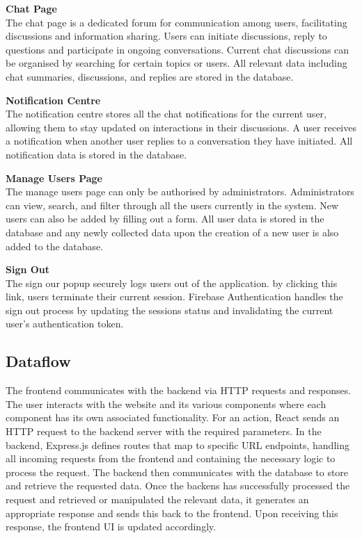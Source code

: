 \textbf{Chat Page}\\
The chat page is a dedicated forum for communication among users, facilitating discussions and information sharing. Users can initiate discussions, reply to questions and participate in ongoing conversations. Current chat discussions can be organised by searching for certain topics or users. All relevant data including chat summaries, discussions, and replies are stored in the database.

\textbf{Notification Centre}\\
The notification centre stores all the chat notifications for the current user, allowing them to stay updated on interactions in their discussions. A user receives a notification when another user replies to a conversation they have initiated. All notification data is stored in the database.

\textbf{Manage Users Page}\\
The manage users page can only be authorised by administrators. Administrators can view, search, and filter through all the users currently in the system. New users can also be added by filling out a form. All user data is stored in the database and any newly collected data upon the creation of a new user is also added to the database.

\textbf{Sign Out}\\
The sign our popup securely logs users out of the application. by clicking this link, users terminate their current session. Firebase Authentication handles the sign out process by updating the sessions status and invalidating the current user's authentication token.

\subsection{Dataflow}
The frontend communicates with the backend via HTTP requests and responses. The user interacts with the website and its various components where each component has its own associated functionality. For an action, React sends an HTTP request to the backend server with the required parameters. In the backend, Express.js defines routes that map to specific URL endpoints, handling all incoming requests from the frontend and containing the necessary logic to process the request. The backend then communicates with the database to store and retrieve the requested data. Once the backens has successfully processed the request and retrieved or manipulated the relevant data, it generates an appropriate response and sends this back to the frontend. Upon receiving this response, the frontend UI is updated accordingly.


